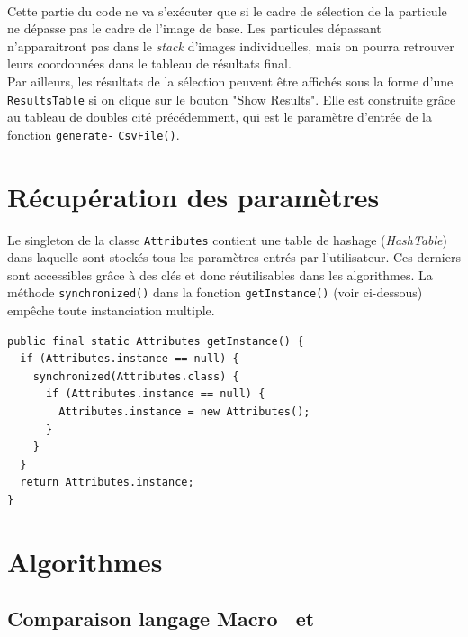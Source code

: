 \paragraph*{}
Cette partie du code ne va s'exécuter que si le cadre de sélection de la particule ne dépasse pas le cadre de l'image de base. Les particules dépassant n'apparaitront pas dans le \textit{stack} d'images individuelles, mais on pourra retrouver leurs coordonnées dans le tableau de résultats final. \\

Par ailleurs, les résultats de la sélection peuvent être affichés sous la forme d'une \texttt{ResultsTable} si on clique sur le bouton "Show Results". Elle est construite grâce au tableau de doubles cité précédemment, qui est le paramètre d'entrée de la fonction \texttt{generate-} \texttt{CsvFile()}. 
\pagebreak
\section{Récupération des paramètres}

Le singleton de la classe \texttt{Attributes} contient une table de hashage (\emph{HashTable}) dans laquelle sont stockés tous les paramètres entrés par l'utilisateur. Ces derniers sont accessibles grâce à des clés et donc réutilisables dans les algorithmes. La méthode  \texttt{synchronized()} dans la fonction \texttt{getInstance()} (voir ci-dessous) empêche toute instanciation multiple.

\begin{center}
\begin{fmpage}{11cm}
\begin{small}
\begin{lstlisting}
public final static Attributes getInstance() {
  if (Attributes.instance == null) {
    synchronized(Attributes.class) {
      if (Attributes.instance == null) {
        Attributes.instance = new Attributes();
      }
    }
  }
  return Attributes.instance;
}
\end{lstlisting}
\end{small}	
\end{fmpage}
\end{center}


\section{Algorithmes}

\subsection{Comparaison langage Macro \imj ~et \java}

